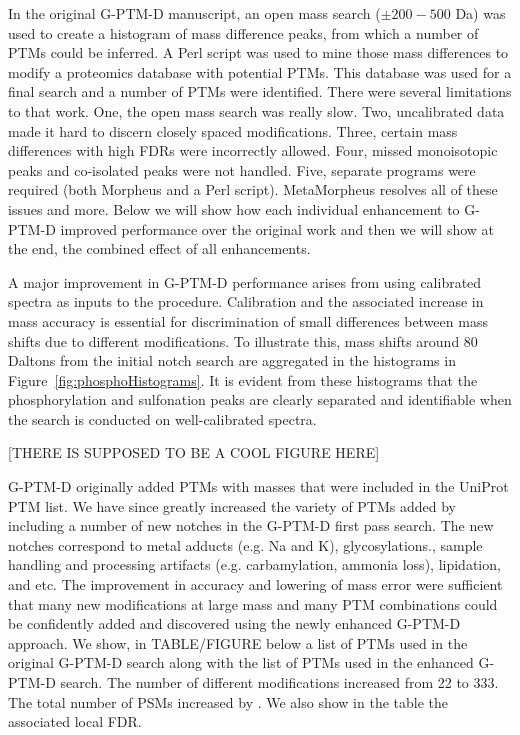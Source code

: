 \documentclass[journal=jprobs,manuscript=article]{achemso}
\begin{document}
In the original G-PTM-D manuscript, an open mass search ($\pm 200-500 $ Da) was used to create a histogram of mass difference peaks, from which a number of PTMs could be inferred.
A Perl script was used to mine those mass differences to modify a proteomics database with potential PTMs.
This database was used for a final search and a number of PTMs were identified.
There were several limitations to that work.
One, the open mass search was really slow.
Two, uncalibrated data made it hard to discern closely spaced modifications.
Three, certain mass differences with high FDRs were incorrectly allowed.
Four, missed monoisotopic peaks and co-isolated peaks were not handled.
Five, separate programs were required (both Morpheus and a Perl script).
MetaMorpheus resolves all of these issues and more.
Below we will show how each individual enhancement to G-PTM-D improved performance over the original work and then we will show at the end, the combined effect of all enhancements.

A major improvement in G-PTM-D performance arises from using calibrated spectra as inputs to the procedure.
Calibration and the associated increase in mass accuracy is essential for discrimination of small differences between mass shifts due to different modifications.
To illustrate this, mass shifts around 80 Daltons from the initial notch search are aggregated in the histograms in Figure~\ref{fig:phosphoHistograms}.
It is evident from these histograms that the phosphorylation and sulfonation peaks are clearly separated and identifiable when the search is conducted on well-calibrated spectra.

[THERE IS SUPPOSED TO BE A COOL FIGURE HERE]

G-PTM-D originally added PTMs with masses that were included in the UniProt PTM list.
We have since greatly increased the variety of PTMs added by including a number of new notches in the G-PTM-D first pass search.
The new notches correspond to metal adducts (e.g. Na and K), glycosylations., sample handling and processing artifacts (e.g. carbamylation, ammonia loss), lipidation, and etc.
The improvement in accuracy and lowering of mass error were sufficient that many new modifications at large mass and many PTM combinations could be confidently added and discovered using the newly enhanced G-PTM-D approach.
We show, in TABLE/FIGURE below a list of PTMs used in the original G-PTM-D search along with the list of PTMs used in the enhanced G-PTM-D search.
The number of different modifications increased from 22 to 333.
The total number of PSMs increased by . We also show in the table the associated local FDR.
\end{document}
